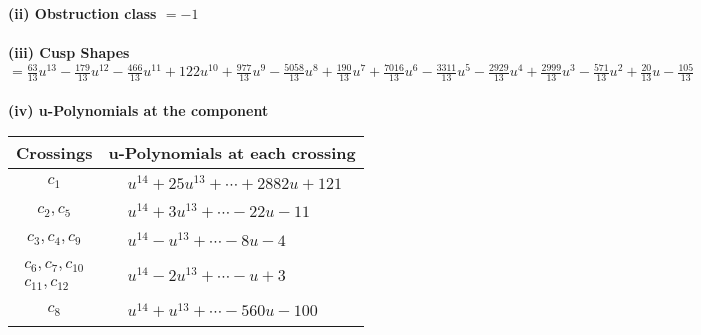 \documentclass[1p]{elsarticle_modified}
\theoremstyle{definition}
\begin{document}
\flushleft \textbf{(ii) Obstruction class $= -1$}\\~\\
\flushleft \textbf{(iii) Cusp Shapes $= \frac{63}{13} u^{13}-\frac{179}{13} u^{12}-\frac{466}{13} u^{11}+122 u^{10}+\frac{977}{13} u^9-\frac{5058}{13} u^8+\frac{190}{13} u^7+\frac{7016}{13} u^6-\frac{3311}{13} u^5-\frac{2929}{13} u^4+\frac{2999}{13} u^3-\frac{571}{13} u^2+\frac{20}{13} u-\frac{105}{13}$}\\~\\
\newpage\renewcommand{\arraystretch}{1}
\flushleft \textbf{(iv) u-Polynomials at the component}\newline \\
\begin{tabular}{m{50pt}|m{274pt}}
Crossings & \hspace{64pt}u-Polynomials at each crossing \\
\hline $$\begin{aligned}c_{1}\end{aligned}$$&$\begin{aligned}
&u^{14}+25 u^{13}+\cdots+2882 u+121
\end{aligned}$\\
\hline $$\begin{aligned}c_{2},c_{5}\end{aligned}$$&$\begin{aligned}
&u^{14}+3 u^{13}+\cdots-22 u-11
\end{aligned}$\\
\hline $$\begin{aligned}c_{3},c_{4},c_{9}\end{aligned}$$&$\begin{aligned}
&u^{14}- u^{13}+\cdots-8 u-4
\end{aligned}$\\
\hline $$\begin{aligned}c_{6},c_{7},c_{10}\\c_{11},c_{12}\end{aligned}$$&$\begin{aligned}
&u^{14}-2 u^{13}+\cdots- u+3
\end{aligned}$\\
\hline $$\begin{aligned}c_{8}\end{aligned}$$&$\begin{aligned}
&u^{14}+u^{13}+\cdots-560 u-100
\end{aligned}$\\
\hline
\end{tabular}\\~\\
\end{document}

